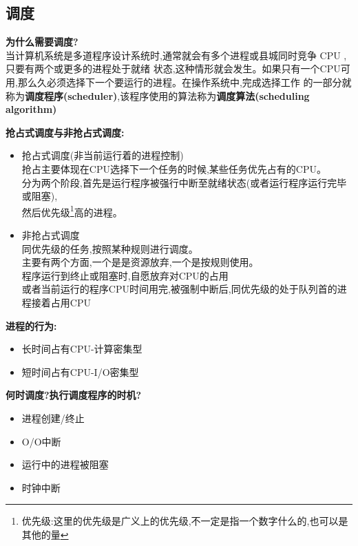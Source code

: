 \documentclass[UTF8,a4paper]{ctexart}
\newcommand{\spaceline}{\vspace{\baselineskip}}
\begin{document}
    \subsection{调度}
    \textbf{为什么需要调度?}\\
    当计算机系统是多道程序设计系统时,通常就会有多个进程或县城同时竞争 CPU ,只要有两个或更多的进程处于就绪
    状态,这种情形就会发生。如果只有一个CPU可用,那么久必须选择下一个要运行的进程。在操作系统中,完成选择工作
    的一部分就称为\textbf{调度程序(scheduler)},该程序使用的算法称为\textbf{调度算法(scheduling algorithm)}

    \spaceline
    \textbf{抢占式调度与非抢占式调度:}
    \begin{itemize}
      \item 抢占式调度(非当前运行着的进程控制)\\
      抢占主要体现在CPU选择下一个任务的时候,某些任务优先占有的CPU。\\
      分为两个阶段,首先是运行程序被强行中断至就绪状态(或者运行程序运行完毕或阻塞),\\
      然后优先级\footnote{优先级:这里的优先级是广义上的优先级,不一定是指一个数字什么的,也可以是其他的量}高的进程。

      \item 非抢占式调度\\
      同优先级的任务,按照某种规则进行调度。\\
      主要有两个方面,一个是是资源放弃,一个是按规则使用。\\
      程序运行到终止或阻塞时,自愿放弃对CPU的占用\\
      或者当前运行的程序CPU时间用完,被强制中断后,同优先级的处于队列首的进程接着占用CPU
    \end{itemize}

    \spaceline
    \textbf{进程的行为:}
    \begin{itemize}
      \item 长时间占有CPU-计算密集型
      \item 短时间占有CPU-I/O密集型
    \end{itemize}

    \spaceline
    \textbf{何时调度?执行调度程序的时机?}
    \begin{itemize}
      \item 进程创建/终止
      \item O/O中断
      \item 运行中的进程被阻塞
      \item 时钟中断
    \end{itemize}
\end{document}
